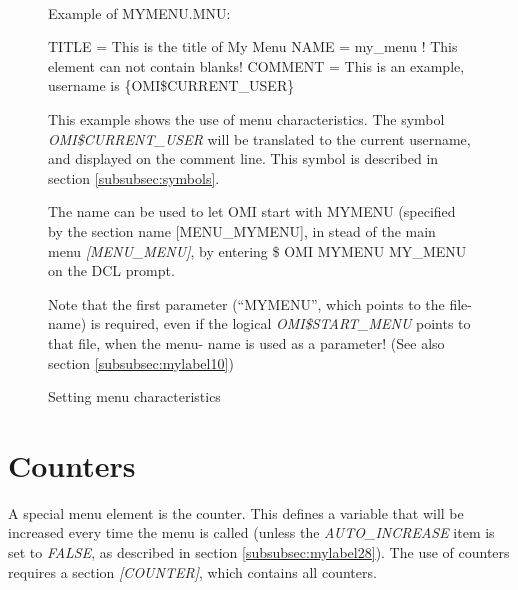 \documentclass[a4paper]{book}
\renewcommand{\indent}{\hspace*{5mm}}
\begin{document}
\begin{figure}[ht]
\begin{minipage}[t]{\textwidth}
\hrulefill \\
\noindent Example of MYMENU.MNU: \newline
\begin{ttfamily}
 \newline
\indent TITLE = This is the title of My Menu \newline
\indent NAME = my{\_}menu ! This element can not contain blanks! \newline
\indent COMMENT = This is an example, username is {\{}OMI{\$}CURRENT{\_}USER{\}} \newline
\end{ttfamily}
\noindent This example shows the use of menu characteristics. The symbol 
\textsl{OMI{\$}CURRENT{\_}USER} will be translated to the current username, and 
displayed on the comment line. This symbol is described in section \ref{subsubsec:symbols}.

The name can be used to let OMI start with MYMENU (specified by the section 
name [MENU{\_}MYMENU], in stead of the main menu \textsl{[MENU{\_}MENU]}, by entering \newline
\indent \textsf{{\$} OMI MYMENU MY{\_}MENU} \newline
on the DCL prompt.

Note that the first parameter (``MYMENU'', which points to the file- name) is 
required, even if the logical \textsl{OMI{\$}START{\_}MENU} points to that file, when 
the menu- name is used as a parameter! (See also section \ref{subsubsec:mylabel10})
\caption{Setting menu characteristics}
\hrulefill
\end{minipage}
\end{figure}

\section{Counters}
\label{subsec:counters}

A special menu element is the counter. This defines a variable that will be 
increased every time the menu is called (unless the \textsl{AUTO{\_}INCREASE} item is 
set to \textsl{FALSE}, as described in section \ref{subsubsec:mylabel28}).
The use of counters requires a section \textsl{[COUNTER]}, which contains all counters.
\end{document}
